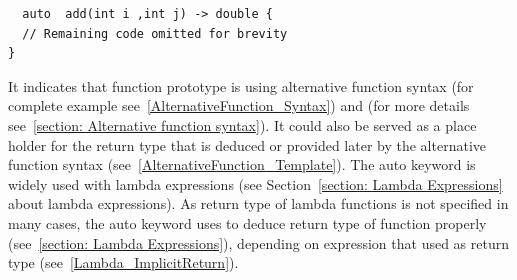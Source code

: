 \documentclass[11pt]{report}
\begin{document}
\begin{lstlisting}
  auto  add(int i ,int j) -> double {
  // Remaining code omitted for brevity
}
\end{lstlisting}
It indicates that function prototype is using alternative function syntax (for complete example see~\ref{AlternativeFunction_Syntax}) and (for more details see~\ref{section: Alternative function syntax}). It could also be served as a place holder for the return type that is deduced or provided later by the alternative function syntax (see~\ref{AlternativeFunction_Template}). The auto keyword is widely used with lambda expressions (see Section~\ref{section: Lambda Expressions} about lambda expressions). As return type of lambda functions is not specified in many cases, the auto keyword uses to deduce return type of function properly (see~\ref{section: Lambda Expressions}), depending on expression that used as return type (see~\ref{Lambda_ImplicitReturn}).

\end{document}
